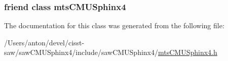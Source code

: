 \subsubsection[{mts\+C\+M\+U\+Sphinx4}]{\setlength{\rightskip}{0pt plus 5cm}friend class {\bf mts\+C\+M\+U\+Sphinx4}\hspace{0.3cm}{\ttfamily [friend]}}\label{classmts_c_m_u_sphinx4_1_1_context_a9fe1241bdee240deba664bfbaadf5301}


The documentation for this class was generated from the following file\+:\begin{DoxyCompactItemize}
\item 
/\+Users/anton/devel/cisst-\/saw/saw\+C\+M\+U\+Sphinx4/include/saw\+C\+M\+U\+Sphinx4/\hyperlink{mts_c_m_u_sphinx4_8h}{mts\+C\+M\+U\+Sphinx4.\+h}\end{DoxyCompactItemize}
